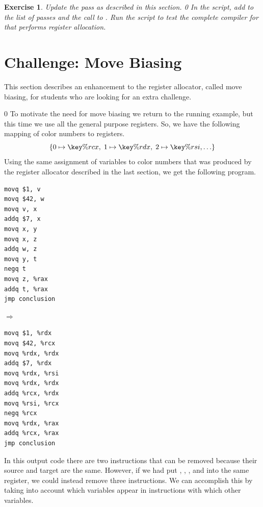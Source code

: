 \documentclass[7x10]{TimesAPriori_MIT}%
\def\racketEd{0}
\def\edition{1}
\newcommand{\racket}[1]{{\if\edition\racketEd{#1}\fi}}
\newtheorem{exercise}[theorem]{Exercise}
\numberwithin{theorem}{chapter}
\numberwithin{definition}{chapter}
\numberwithin{equation}{chapter}
\begin{document}
\begin{exercise}\normalfont\normalsize
Update the  pass as described in this section.
%
\racket{
In the  script, add \code{prelude\_and\_conclusion} to the
list of passes and the call to \code{compiler-tests}.}
%
Run the script to test the complete compiler for \LangVar{} that
performs register allocation.
\end{exercise}

\section{Challenge: Move Biasing}
\label{sec:move-biasing}

This section describes an enhancement to the register allocator,
called move biasing, for students who are looking for an extra
challenge.

{\if\edition\racketEd      
To motivate the need for move biasing we return to the running example,
but this time we use all the general purpose registers. So, we have
the following mapping of color numbers to registers.
\[
  \{ 0 \mapsto \key{\%rcx}, \; 1 \mapsto \key{\%rdx}, \; 2 \mapsto \key{\%rsi}, \ldots \}
\]
Using the same assignment of variables to color numbers that was
produced by the register allocator described in the last section, we
get the following program.
\begin{center}
\begin{minipage}{0.35\textwidth}
\begin{lstlisting}
movq $1, v
movq $42, w
movq v, x
addq $7, x
movq x, y
movq x, z
addq w, z
movq y, t
negq t
movq z, %rax
addq t, %rax
jmp conclusion
\end{lstlisting}
\end{minipage}
$\Rightarrow\qquad$
\begin{minipage}{0.45\textwidth}
\begin{lstlisting}
movq $1, %rdx
movq $42, %rcx
movq %rdx, %rdx
addq $7, %rdx
movq %rdx, %rsi
movq %rdx, %rdx
addq %rcx, %rdx
movq %rsi, %rcx
negq %rcx
movq %rdx, %rax
addq %rcx, %rax
jmp conclusion
\end{lstlisting}
\end{minipage}
\end{center}
In this output code there are two  instructions that
can be removed because their source and target are the same.  However,
if we had put , , , and  into the same
register, we could instead remove three  instructions.  We
can accomplish this by taking into account which variables appear in
 instructions with which other variables.
\fi}
\end{document}
